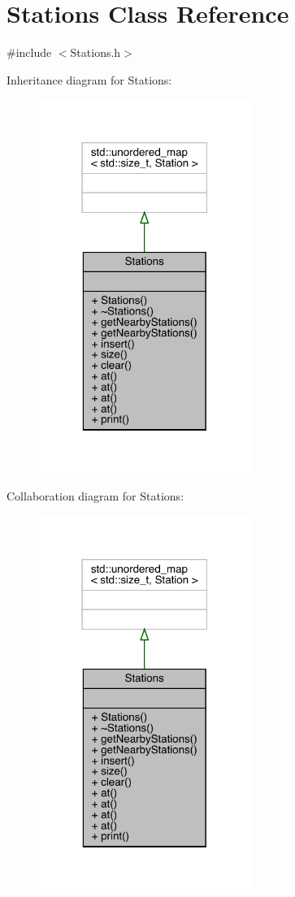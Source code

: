 \hypertarget{class_stations}{}\section{Stations Class Reference}
\label{class_stations}


{\ttfamily \#include $<$Stations.\+h$>$}



Inheritance diagram for Stations\+:\nopagebreak
\begin{figure}[H]
\begin{center}
\leavevmode
\includegraphics[width=195pt]{class_stations__inherit__graph}
\end{center}
\end{figure}


Collaboration diagram for Stations\+:\nopagebreak
\begin{figure}[H]
\begin{center}
\leavevmode
\includegraphics[width=195pt]{class_stations__coll__graph}
\end{center}
\end{figure}
